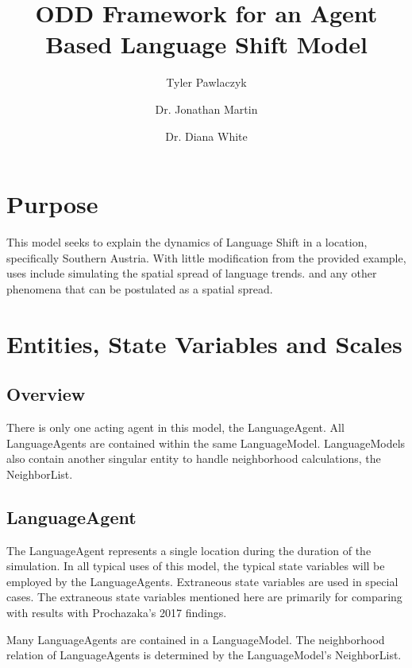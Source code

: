 \documentclass{article}
\title{ODD Framework for an Agent Based  Language Shift Model}
\author{Tyler Pawlaczyk \and Dr. Jonathan Martin \and Dr. Diana White}
\begin{document}
\maketitle

\section{Purpose}
This model seeks to explain the dynamics of Language Shift in a location, specifically Southern Austria. With little modification from the provided example, uses include simulating the spatial spread of language trends.  and any other phenomena that can be postulated as a spatial spread.

\section{Entities, State Variables and Scales}
\subsection{Overview}
There is only one acting agent in this model, the LanguageAgent. All LanguageAgents are contained within the same LanguageModel. LanguageModels also contain another singular entity to handle neighborhood calculations, the NeighborList.

\subsection{LanguageAgent}

The LanguageAgent represents a single location during the duration of the simulation. In all typical uses of this model, the typical state variables will be employed by the LanguageAgents. Extraneous state variables are used in special cases. The extraneous state variables mentioned here are primarily for comparing with results with Prochazaka's 2017 findings.

Many LanguageAgents are contained in a LanguageModel. The neighborhood relation of LanguageAgents is determined by the LanguageModel's NeighborList.
\end{document}
